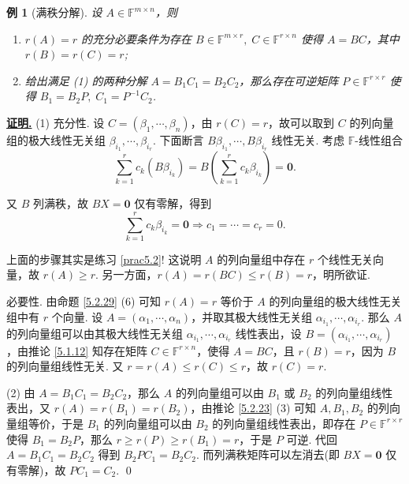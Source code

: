 \documentclass[10pt,openany]{article}
\theoremstyle{thmstyle} %
\theoremstyle{defstyle} %
\theoremstyle{prostyle} %
\theoremstyle{exastyle}
\newtheorem{example}[theorem]{例}
\theoremstyle{remstyle}
\renewenvironment{proof}[1][证明]{\par\underline{\textbf{#1.}} \;\fangsong}{\qed\par}
\newcommand{\F}{\mathbb{F}}
\newcommand{\mn}{^{m \times n}}
\begin{document}
\begin{example}[满秩分解]
	设 \( A \in \F\mn \)，则
	\begin{enumerate}[(1)]
		\item \( r(A)=r \) 的充分必要条件为存在 \( B \in \F^{m \times r}, \; C \in \F^{r \times n} \) 使得 \( A=BC \)，其中 \( r(B)=r(C)=r \);
		\item 给出满足 (1) 的两种分解 \( A=B_1C_1=B_2C_2 \)，那么存在可逆矩阵 \( P \in \F^{r \times r} \) 使得 \( B_1=B_2P, \; C_1=P^{-1}C_2 \).
	\end{enumerate}
\end{example}

\begin{proof}
	(1) 充分性. 设 \( C=(\beta_1,\cdots,\beta_n) \)，由 \( r(C)=r \)，故可以取到 \( C \) 的列向量组的极大线性无关组 \( \beta_{i_1},\cdots,\beta_{i_r} \). 下面断言 \( B\beta_{i_1},\cdots,B\beta_{i_r} \) 线性无关. 考虑 \( \F\)-线性组合 
	\[ \sum_{k=1}^{r} c_k(B\beta_{i_k})= B \left( \sum_{k=1}^{r} c_k\beta_{i_k} \right)= \bm{0}. \]
	
	又 \( B \) 列满秩，故 \( BX=\bm{0} \) 仅有零解，得到 
	\[ \sum_{k=1}^{r} c_k\beta_{i_k} = \bm{0} \Rightarrow c_1=\cdots=c_r=0. \]
	
	上面的步骤其实是练习 \ref{prac5.2}! 这说明 \( A \) 的列向量组中存在 \( r \) 个线性无关向量，故 \( r(A) \geq r \). 另一方面，\( r(A)=r(BC) \leq r(B)=r \)，明所欲证.
	
	必要性. 由命题 \ref{5.2.29} (6) 可知 \( r(A)=r \) 等价于 \( A \) 的列向量组的极大线性无关组中有 \( r \) 个向量. 设 \( A=(\alpha_1,\cdots,\alpha_n) \)，并取其极大线性无关组 \( \alpha_{i_1},\cdots,\alpha_{i_r} \). 那么 \( A \) 的列向量组可以由其极大线性无关组 \( \alpha_{i_1},\cdots,\alpha_{i_r} \) 线性表出，设 \( B=(\alpha_{i_1},\cdots,\alpha_{i_r}) \)，由推论 \ref{5.1.12} 知存在矩阵 \( C \in \F^{r \times n} \)，使得 \( A=BC \)，且 \( r(B)=r \)，因为 \( B \) 的列向量组线性无关. 又 \( r=r(A) \leq r(C) \leq r \)，故 \( r(C)=r \).
	
	(2) 由 \( A=B_1C_1=B_2C_2 \)，那么 \( A \) 的列向量组可以由 \( B_1 \) 或 \( B_2 \) 的列向量组线性表出，又 \( r(A)=r(B_1)=r(B_2) \)，由推论 \ref{5.2.23} (3) 可知 \( A,B_1,B_2 \) 的列向量组等价，于是 \( B_1 \) 的列向量组可以由 \( B_2 \) 的列向量组线性表出，即存在 \( P \in \F^{r \times r} \) 使得 \( B_1=B_2P \)，那么 \( r \geq r(P) \geq r(B_1)=r \)，于是 \( P \) 可逆. 代回 \( A=B_1C_1=B_2C_2 \) 得到 \( B_2PC_1=B_2C_2 \). 而列满秩矩阵可以左消去(即 \( BX=\bm{0} \) 仅有零解)，故 \( PC_1=C_2 \).
\end{proof}
\end{document}
